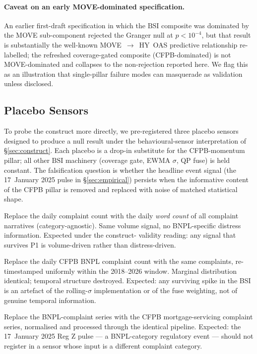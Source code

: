 \documentclass[11pt,letterpaper]{article}
\newcommand{\bsi}{\text{BSI}}
\begin{document}
\paragraph{Caveat on an early MOVE-dominated specification.}
An earlier first-draft specification in which the $\bsi$ composite was
dominated by the MOVE sub-component rejected the Granger null at
$p < 10^{-4}$, but that result is substantially the well-known
MOVE~$\rightarrow$~HY~OAS predictive relationship re-labelled; the
refreshed coverage-gated composite (CFPB-dominated) is not
MOVE-dominated and collapses to the non-rejection reported here.
We flag this as an illustration that single-pillar failure modes can
masquerade as validation unless disclosed.

\subsection{Placebo Sensors}
\label{sec:placebos}

To probe the construct more directly, we pre-registered three placebo
sensors designed to produce a null result under the behavioural-sensor
interpretation of \S\ref{sec:construct}. Each placebo is a
drop-in substitute for the CFPB-momentum pillar; all other
$\bsi$ machinery (coverage gate, EWMA $\sigma$, QP fuse) is held
constant. The falsification question is whether the headline event
signal (the 17~January 2025 pulse in \S\ref{sec:empirical}) persists
when the informative content of the CFPB pillar is removed and
replaced with noise of matched statistical shape.

\begin{description}[leftmargin=*,itemsep=2pt]
\item[\textnormal{(P1)} \textbf{Word-count placebo.}] Replace the
  daily complaint count with the daily \emph{word count} of all
  complaint narratives (category-agnostic). Same volume signal, no
  BNPL-specific distress information. Expected under the construct-
  validity reading: any signal that survives P1 is volume-driven
  rather than distress-driven.
\item[\textnormal{(P2)} \textbf{Randomised-timestamp placebo.}]
  Replace the daily CFPB BNPL complaint count with the same
  complaints, re-timestamped uniformly within the 2018--2026 window.
  Marginal distribution identical; temporal structure destroyed.
  Expected: any surviving spike in the BSI is an artefact of the
  rolling-$\sigma$ implementation or of the fuse weighting, not of
  genuine temporal information.
\item[\textnormal{(P3)} \textbf{Non-BNPL-category placebo.}] Replace
  the BNPL-complaint series with the CFPB mortgage-servicing
  complaint series, normalised and processed through the identical
  pipeline. Expected: the 17~January 2025 Reg Z pulse --- a
  BNPL-category regulatory event --- should not register in a
  sensor whose input is a different complaint category.
\end{description}
\end{document}
